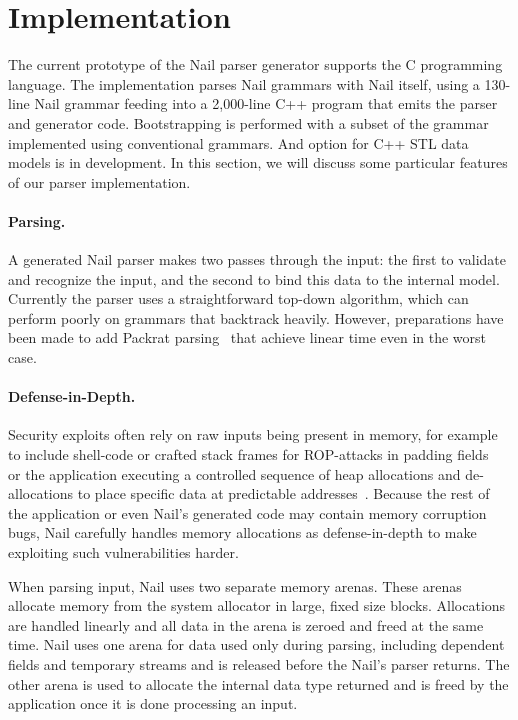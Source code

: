 \section{Implementation}
\label{s:impl}

The current prototype of the Nail parser generator supports the C programming
language. The implementation parses Nail grammars with Nail itself, using a
130-line Nail grammar feeding into a 2,000-line C++ program that
emits the parser and generator code. Bootstrapping is
performed with a subset of the grammar implemented using conventional grammars. 
And option for C++ STL data models  is in development. In
this section, we will discuss some particular features of our parser
implementation.



\paragraph{Parsing.}

A generated Nail parser makes two passes through the input: the first to
validate and recognize the input, and the second to bind this data to the internal
model. Currently the parser uses a straightforward top-down algorithm, which can perform poorly on
grammars that backtrack heavily. However, preparations have been made to add Packrat
parsing~\cite{packrat-parsing:icfp02} that achieve linear time even in the worst case.

\paragraph{Defense-in-Depth.}

Security exploits often rely on raw inputs being present in memory, for example to include
shell-code or crafted stack frames for ROP-attacks in padding fields~\cite{shotgun-parser} or the
application executing a controlled sequence of heap allocations and de-allocations to place
specific data at predictable addresses~\cite{jp-advanced, vudo-malloc}. Because the rest of the
application or even Nail's generated code may contain memory corruption bugs, Nail
carefully handles memory allocations as defense-in-depth to make exploiting such vulnerabilities harder.

When parsing input, Nail uses two separate memory arenas. These arenas allocate memory from the
system allocator in large, fixed size blocks. Allocations are handled linearly and all data in the
arena is zeroed and freed at the same time. Nail uses one arena for data used only during parsing,
including dependent fields and temporary streams and is released before the Nail's parser returns.
The other arena is used to allocate the internal data type returned and is freed by the application
once it is done processing an input. 

